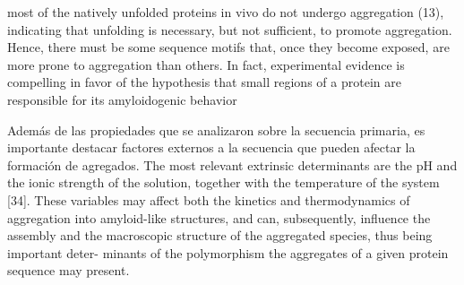  most of the natively unfolded proteins in vivo do not undergo aggregation (13), indicating that unfolding is necessary, but not sufficient, to promote aggregation. 
Hence, there must be some sequence motifs that, once they become exposed, are more prone to aggregation than others. 
In fact, experimental evidence is compelling in favor of the hypothesis that small regions of a protein are responsible for its amyloidogenic behavior

% 



Además de las propiedades que se analizaron sobre la secuencia primaria, es importante destacar factores externos a la secuencia que pueden afectar la formación de agregados.
The most relevant extrinsic determinants are the pH and
the ionic strength of the solution, together with the temperature of the system [34].
These variables may affect both the kinetics and thermodynamics of aggregation
into amyloid-like structures, and can, subsequently, influence the assembly and
the macroscopic structure of the aggregated species, thus being important deter-
minants of the polymorphism the aggregates of a given protein sequence may
present.











